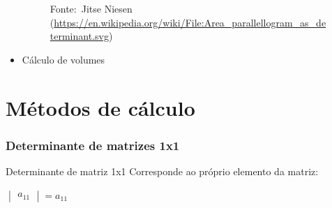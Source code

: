 \documentclass[pdftex, brazil]{beamer}
\begin{document}
\begin{frame}[t]
\begin{itemize}
{\begin{figure}[H]
\begin{center}
          \footnotesize{Fonte:~Jitse Niesen\\ \tiny{(\url{https://en.wikipedia.org/wiki/File:Area\_parallellogram\_as\_determinant.svg})}}
        \end{center}
      \end{figure}}
    \item Cálculo de volumes
  \end{itemize}
\end{frame}

\section{Métodos de cálculo}

\begin{frame}[t]
  \frametitle{Determinante de matrizes 1x1}
  \begin{block}{Determinante de matriz 1x1}
    Corresponde ao próprio elemento da matriz:
    \begin{center}
    $\begin{vmatrix}
      a_{11}\end{vmatrix} = a_{11}$
    \end{center}
  \end{block}
\end{frame}
\end{document}
